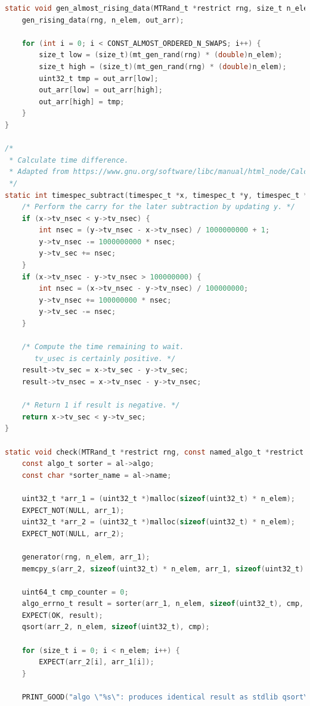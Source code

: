\documentclass[12pt]{article}
\begin{document}
\begin{lstlisting}[language=C]
static void gen_almost_rising_data(MTRand_t *restrict rng, size_t n_elem, uint32_t *restrict out_arr) {
    gen_rising_data(rng, n_elem, out_arr);

    for (int i = 0; i < CONST_ALMOST_ORDERED_N_SWAPS; i++) {
        size_t low = (size_t)(mt_gen_rand(rng) * (double)n_elem);
        size_t high = (size_t)(mt_gen_rand(rng) * (double)n_elem);
        uint32_t tmp = out_arr[low];
        out_arr[low] = out_arr[high];
        out_arr[high] = tmp;
    }
}

/*
 * Calculate time difference.
 * Adapted from https://www.gnu.org/software/libc/manual/html_node/Calculating-Elapsed-Time.html.
 */
static int timespec_subtract(timespec_t *x, timespec_t *y, timespec_t *result) {
    /* Perform the carry for the later subtraction by updating y. */
    if (x->tv_nsec < y->tv_nsec) {
        int nsec = (y->tv_nsec - x->tv_nsec) / 1000000000 + 1;
        y->tv_nsec -= 1000000000 * nsec;
        y->tv_sec += nsec;
    }
    if (x->tv_nsec - y->tv_nsec > 100000000) {
        int nsec = (x->tv_nsec - y->tv_nsec) / 100000000;
        y->tv_nsec += 100000000 * nsec;
        y->tv_sec -= nsec;
    }

    /* Compute the time remaining to wait.
       tv_usec is certainly positive. */
    result->tv_sec = x->tv_sec - y->tv_sec;
    result->tv_nsec = x->tv_nsec - y->tv_nsec;

    /* Return 1 if result is negative. */
    return x->tv_sec < y->tv_sec;
}

static void check(MTRand_t *restrict rng, const named_algo_t *restrict al, size_t n_elem, comp_t cmp, uint64_t threshold, gen_data_t generator) {
    const algo_t sorter = al->algo;
    const char *sorter_name = al->name;

    uint32_t *arr_1 = (uint32_t *)malloc(sizeof(uint32_t) * n_elem);
    EXPECT_NOT(NULL, arr_1);
    uint32_t *arr_2 = (uint32_t *)malloc(sizeof(uint32_t) * n_elem);
    EXPECT_NOT(NULL, arr_2);

    generator(rng, n_elem, arr_1);
    memcpy_s(arr_2, sizeof(uint32_t) * n_elem, arr_1, sizeof(uint32_t) * n_elem);

    uint64_t cmp_counter = 0;
    algo_errno_t result = sorter(arr_1, n_elem, sizeof(uint32_t), cmp, threshold, &cmp_counter);
    EXPECT(OK, result);
    qsort(arr_2, n_elem, sizeof(uint32_t), cmp);

    for (size_t i = 0; i < n_elem; i++) {
        EXPECT(arr_2[i], arr_1[i]);
    }

    PRINT_GOOD("algo \"%s\": produces identical result as stdlib qsort\n", sorter_name);


\end{lstlisting}
\end{document}
